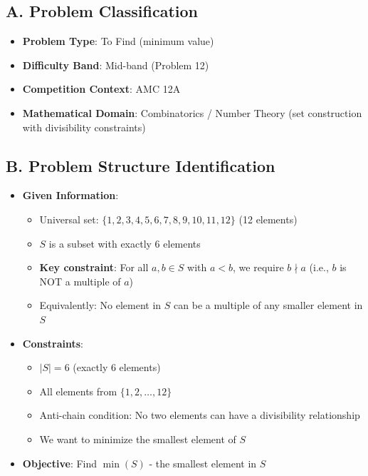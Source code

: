 \documentclass[12pt]{article}
\begin{document}
\begin{problemconfigbox}
\subsection*{A. Problem Classification}
\begin{itemize}[leftmargin=*]
    \item \textbf{Problem Type}: To Find (minimum value)
    \item \textbf{Difficulty Band}: Mid-band (Problem 12)
    \item \textbf{Competition Context}: AMC 12A
    \item \textbf{Mathematical Domain}: Combinatorics / Number Theory (set construction with divisibility constraints)
\end{itemize}

\subsection*{B. Problem Structure Identification}
\begin{itemize}[leftmargin=*]
    \item \textbf{Given Information}:
    \begin{itemize}
        \item Universal set: $\{1,2,3,4,5,6,7,8,9,10,11,12\}$ (12 elements)
        \item $S$ is a subset with exactly 6 elements
        \item \textbf{Key constraint}: For all $a, b \in S$ with $a < b$, we require $b \nmid a$ (i.e., $b$ is NOT a multiple of $a$)
        \item Equivalently: No element in $S$ can be a multiple of any smaller element in $S$
    \end{itemize}
    
    \item \textbf{Constraints}:
    \begin{itemize}
        \item $|S| = 6$ (exactly 6 elements)
        \item All elements from $\{1,2,\ldots,12\}$
        \item Anti-chain condition: No two elements can have a divisibility relationship
        \item We want to minimize the smallest element of $S$
    \end{itemize}
    
    \item \textbf{Objective}: Find $\min(S)$ - the smallest element in $S$
    

\end{itemize}
\end{problemconfigbox}
\end{document}
